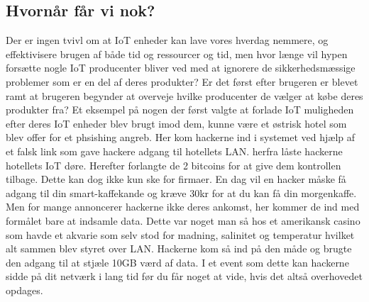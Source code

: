     \subsection {Hvornår får vi nok?}
    Der er ingen tvivl om at IoT enheder kan lave vores hverdag nemmere, og effektivisere brugen af både tid og ressourcer og tid, men hvor længe vil hypen forsætte nogle IoT producenter bliver ved med at ignorere de sikkerhedsmæssige problemer som er en del af deres produkter? Er det først efter brugeren er blevet ramt at brugeren begynder at overveje hvilke producenter de vælger at købe deres produkter fra? Et eksempel på nogen der først valgte at forlade IoT muligheden efter deres IoT enheder blev brugt imod dem, kunne være et østrisk hotel som blev offer for et phsishing angreb. Her kom hackerne ind i systemet ved hjælp af et falsk link som gave hackere adgang til hotellets LAN. herfra låste hackerne hotellets IoT døre. Herefter forlangte de 2 bitcoins for at give dem kontrollen tilbage. Dette kan dog ikke kun ske for firmaer. En dag vil en hacker måske få adgang til din smart-kaffekande og kræve 30kr for at du kan få din morgenkaffe.\\
    Men for mange annoncerer hackerne ikke deres ankomst, her kommer de ind med formålet bare at indsamle data. Dette var noget man så hos et amerikansk casino som havde et akvarie som selv stod for madning, salinitet og temperatur hvilket alt sammen blev styret over LAN. Hackerne kom så ind på den måde og brugte den adgang til at stjæle 10GB værd af data. I et event som dette kan hackerne sidde på dit netværk i lang tid før du får noget at vide, hvis det altså overhovedet opdages.\autocite{Examples}
    
    
    
   
       
